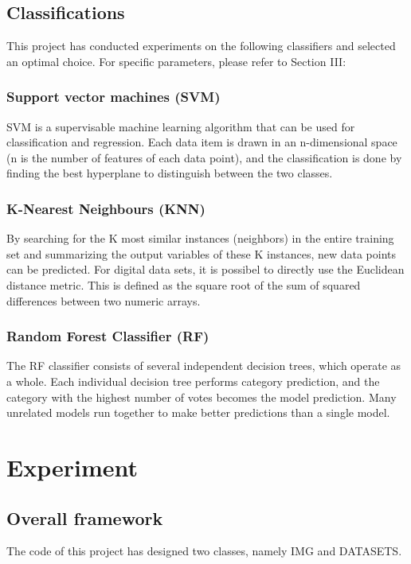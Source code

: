 \documentclass[conference]{IEEEtran}
\begin{document}
\subsection{Classifications}
This project has conducted experiments on the following classifiers and selected an optimal choice. For specific parameters, please refer to Section III:
\subsubsection{Support vector machines (SVM)}
SVM is a supervisable machine learning algorithm that can be used for classification and regression. Each data item is drawn in an n-dimensional space (n is the number of features of each data point), and the classification is done by finding the best hyperplane to distinguish between the two classes. 

\subsubsection{K-Nearest Neighbours (KNN)}
By searching for the K most similar instances (neighbors) in the entire training set and summarizing the output variables of these K instances, new data points can be predicted. For digital data sets, it is possibel to directly use the Euclidean distance metric. This is defined as the square root of the sum of squared differences between two numeric arrays.
\subsubsection{Random Forest Classifier (RF)}
The RF classifier consists of several independent decision trees, which operate as a whole. Each individual decision tree performs category prediction, and the category with the highest number of votes becomes the model prediction. Many unrelated models run together to make better predictions than a single model.

\section{Experiment}
\subsection{Overall framework}
The code of this project has designed two classes, namely IMG and DATASETS.
\end{document}

